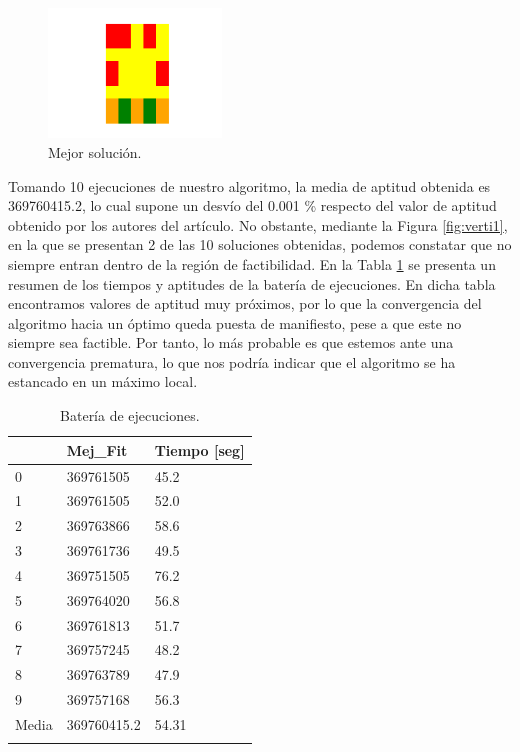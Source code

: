 \documentclass[12pt,a4paper]{book}
\begin{document}
\begin{figure}[h] 
    	\begin{center}
    	\includegraphics[width=0.41\textwidth]{img/sol_mejor.png}
    	\end{center}
    	\caption{Mejor solución.}
    	\label{fig:sol_mia}
	\end{figure}

Tomando 10 ejecuciones de nuestro algoritmo, la media de aptitud obtenida es 369760415.2, lo cual supone un desvío del 0.001 \% respecto del valor de aptitud obtenido por los autores del artículo. No obstante, mediante la Figura \ref{fig:verti1}, en la que se presentan 2 de las 10 soluciones obtenidas, podemos constatar que no siempre entran dentro de la región de factibilidad. En la Tabla \ref{tab: resumen} se presenta un resumen de los tiempos y aptitudes de la batería de ejecuciones. En dicha tabla encontramos valores de aptitud muy próximos, por lo que la convergencia del algoritmo hacia un óptimo queda puesta de manifiesto, pese a que este no siempre sea factible. Por tanto, lo más probable es que estemos ante una convergencia prematura, lo que nos podría indicar que el algoritmo se ha estancado en un máximo local.

\begin{longtable}{lll}
\hline
      &\textbf{ Mej\_Fit}    & \textbf{Tiempo {[}seg{]}} \\ \hline
\endfirsthead
%
\endhead
%
0     & 369761505   & 45.2             \\
1     & 369761505   & 52.0             \\
2     & 369763866   & 58.6             \\
3     & 369761736   & 49.5             \\
4     & 369751505   & 76.2             \\
5     & 369764020   & 56.8             \\
6     & 369761813   & 51.7             \\
7     & 369757245   & 48.2             \\
8     & 369763789   & 47.9             \\
9     & 369757168   & 56.3             \\ \hline
Media & 369760415.2 & 54.31           \\
\caption{Batería de ejecuciones.}
\label{tab: resumen}\\
\end{longtable}
\end{document}
